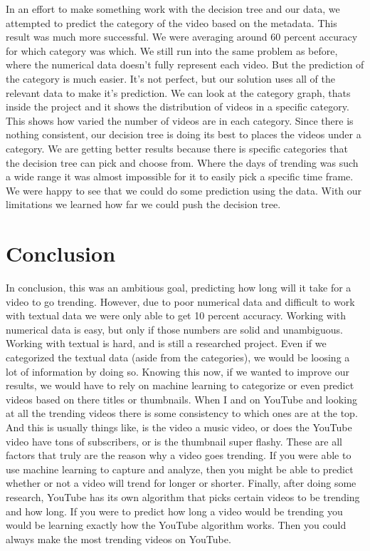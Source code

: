 \documentclass{article}
\begin{document}
\par
    In an effort to make something work with the decision tree and our data, we attempted to predict the category of the video based on the metadata. 
This result was much more successful. We were averaging around 60 percent accuracy for which category was which. 
We still run into the same problem as before, where the numerical data doesn't fully represent each video.
But the prediction of the category is much easier.
It's not perfect, but our solution uses all of the relevant data to make it's prediction.
We can look at the category graph, thats inside the project and it shows the distribution of videos in a specific category. 
This shows how varied the number of videos are in each category. 
Since there is nothing consistent, our decision tree is doing its best to places the videos under a category.
We are getting better results because there is specific categories that the decision tree can pick and choose from.
Where the days of trending was such a wide range it was almost impossible for it to easily pick a specific time frame.
We were happy to see that we could do some prediction using the data. 
With our limitations we learned how far we could push the decision tree.

\section*{Conclusion}
    In conclusion, this was an ambitious goal, predicting how long will it take for a video to go trending. 
However, due to poor numerical data and difficult to work with textual data we were only able to get 10 percent accuracy. 
Working with numerical data is easy, but only if those numbers are solid and unambiguous. 
Working with textual is hard, and is still a researched project.
Even if we categorized the textual data (aside from the categories), we would be loosing a lot of information by doing so.
Knowing this now, if we wanted to improve our results, we would have to rely on machine learning to categorize or even predict videos based on there titles or thumbnails.
When I and on YouTube and looking at all the trending videos there is some consistency to which ones are at the top. 
And this is usually things like, is the video a music video, or does the YouTube video have tons of subscribers, or is the thumbnail super flashy. 
These are all factors that truly are the reason why a video goes trending.  
If you were able to use machine learning to capture and analyze, then you might be able to predict whether or not a video will trend for longer or shorter.
Finally, after doing some research, YouTube has its own algorithm that picks certain videos to be trending and how long. 
If you were to predict how long a video would be trending you would be learning exactly how the YouTube algorithm works. 
Then you could always make the most trending videos on YouTube. 
\end{document}
